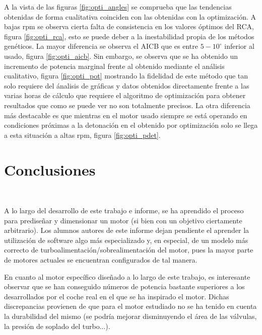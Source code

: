 A la vista de las figuras \ref{fig:opti_angles} se comprueba que las tendencias obtenidas de forma cualitativa coinciden con las obtenidas con la optimización. A bajas rpm se observa %
cierta falta de consistencia en los valores óptimos del RCA, figura \ref{fig:opti_rca}, esto se puede deber a la inestabilidad propia de los métodos genéticos. La mayor diferencia se %
observa el AICB que es entre $5-10^\circ$ inferior al usado, figura \ref{fig:opti_aicb}. Sin  embargo, se observa que se ha obtenido un incremento de potencia marginal frente al obtenido mediante el análisis cualitativo, figura \ref{fig:opti_pot} %
mostrando la fidelidad de este método que tan solo requiere del ánalisis de gráficas y datos obtenidos directamente frente a las varias horas de cálculo que requiere el algoritmo de optimización %
para obtener resultados que como se puede ver no son totalmente precisos. La otra diferencia más destacable es que mientras en el motor usado siempre se está operando en condiciones próximas a la %
detonación en el obtenido por optimización solo se llega a esta situación a altas rpm, figura \ref{fig:opti_pdet}.


\section{Conclusiones} \label{s:section_09}

A lo largo del desarrollo de este trabajo e informe, se ha aprendido el proceso para prediseñar y dimensionar un motor (si bien con un objetivo ciertamente arbitrario). Los alumnos autores de este informe dejan pendiente el aprender la utilización de software algo más especializado y, en especial, de un modelo más correcto de turboalimentación/sobrealimentación del motor, pues la mayor parte de motores actuales se encuentran configurados de tal manera.

En cuanto al motor específico diseñado a lo largo de este trabajo, es interesante observar que se han conseguido números de potencia bastante superiores a los desarrollados por el coche real en el que se ha inspirado el motor. Dichas discrepancias provienen de que para el motor estudiado no se ha tenido en cuenta la durabilidad del mismo (se podría mejorar disminuyendo el área de las válvulas, la presión de soplado del turbo...).







